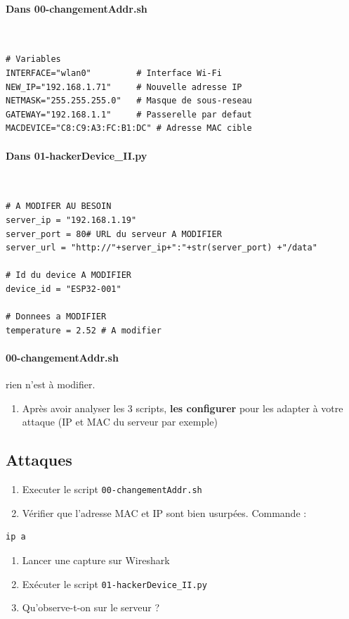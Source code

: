 \documentclass[french, 12pt]{article}%
\begin{document}
\paragraph{Dans 00-changementAddr.sh} \ 
\begin{lstlisting}[style=commande]
# Variables
INTERFACE="wlan0"         # Interface Wi-Fi
NEW_IP="192.168.1.71"     # Nouvelle adresse IP
NETMASK="255.255.255.0"   # Masque de sous-reseau
GATEWAY="192.168.1.1"     # Passerelle par defaut
MACDEVICE="C8:C9:A3:FC:B1:DC" # Adresse MAC cible
\end{lstlisting}


\paragraph{Dans 01-hackerDevice\_II.py}\ 
\begin{lstlisting}[style=commande]
# A MODIFER AU BESOIN
server_ip = "192.168.1.19"
server_port = 80# URL du serveur A MODIFIER 
server_url = "http://"+server_ip+":"+str(server_port) +"/data"

# Id du device A MODIFIER
device_id = "ESP32-001"

# Donnees a MODIFIER
temperature = 2.52 # A modifier
\end{lstlisting}


\paragraph{00-changementAddr.sh} rien n'est à modifier.

\begin{enumerate}[resume]
\item Après avoir analyser les 3 scripts, \textbf{les configurer} pour les adapter à votre attaque (IP et MAC du serveur par exemple)
\end{enumerate}


\subsection{Attaques}
\label{attaque}

\begin{enumerate}[resume]
\item Executer le script \verb?00-changementAddr.sh?
\item Vérifier que l'adresse MAC et IP sont bien usurpées. Commande :
\end{enumerate}
\begin{lstlisting}[style=commande]
ip a
\end{lstlisting}
\begin{enumerate}[resume]
\item Lancer une capture sur Wireshark
\item Exécuter le script \verb?01-hackerDevice_II.py?
\item Qu'observe-t-on sur le serveur ? 
\end{enumerate}
\end{document}
